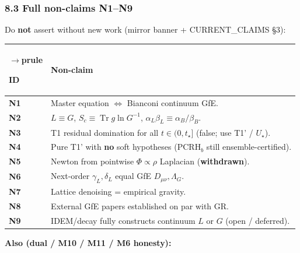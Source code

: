 \documentclass[
  11pt,
]{article}
\newcounter{none} %
\begin{document}
\subsubsection{8.3 Full non-claims N1--N9}\label{full-non-claims-n1n9}

Do \textbf{not} assert without new work (mirror banner + CURRENT\_CLAIMS \S3):

{\def\LTcaptype{none} %
\begin{longtable}[]{@{}
  >{\raggedright\arraybackslash}p{}
  >{\raggedright\arraybackslash}p{}@{}}
$\rightarrow$prule\noalign{}
\begin{minipage}[b]{\linewidth}\raggedright
ID
\end{minipage} & \begin{minipage}[b]{\linewidth}\raggedright
Non-claim
\end{minipage} \\
\midrule\noalign{}
\endhead
\bottomrule\noalign{}
\endlastfoot
\textbf{N1} & Master equation \(\Leftrightarrow\) Bianconi continuum GfE. \\
\textbf{N2} & \(L \equiv G\), \(S_c \equiv \operatorname{Tr} g\ln G^{-1}\), \(\alpha_L\beta_L \equiv \alpha_B/\beta_B\). \\
\textbf{N3} & T1 residual domination for all \(t\in(0,t_\star]\) (false; use T1' / \(U_\star\)). \\
\textbf{N4} & Pure T1' with \textbf{no} soft hypotheses (PCRH\(_b\) still ensemble-certified). \\
\textbf{N5} & Newton from pointwise \(\Phi\propto\rho\) Laplacian (\textbf{withdrawn}). \\
\textbf{N6} & Next-order \(\gamma_L,\delta_L\) equal GfE \(D_{\mu\nu},\Lambda_G\). \\
\textbf{N7} & Lattice denoising = empirical gravity. \\
\textbf{N8} & External GfE papers established on par with GR. \\
\textbf{N9} & IDEM/decay fully constructs continuum \(L\) or \(G\) (open / deferred). \\
\end{longtable}
}

\textbf{Also (dual / M10 / M11 / M6 honesty):}
\end{document}
